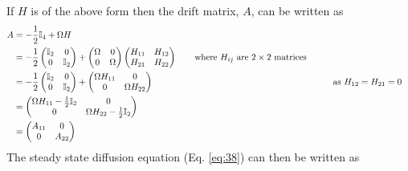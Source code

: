 \documentclass[11pt,a4paper]{article}
\numberwithin{equation}{section}
\begin{document}
	\color{red}If $H$ is of the above form then the drift matrix, $A$, can be written as
	\begin{align*}
	A &= -\frac{1}{2}\mathbb{I}_4 + \Omega H&\\
	 &= -\frac{1}{2} \begin{pmatrix}
	 \mathbb{I}_2 & 0  \\
	 0 & \mathbb{I}_2\\
	 \end{pmatrix} +  \begin{pmatrix}
	 \Omega & 0  \\
	 0 & \Omega\\
	 \end{pmatrix}
	 \begin{pmatrix}
	 H_{11} & H_{12}  \\
	 H_{21} & H_{22}\\
	 \end{pmatrix} \tag*{where $H_{ij}$ are $2 \times 2$ matrices}&\\
	  &=  -\frac{1}{2} \begin{pmatrix}
	  \mathbb{I}_2 & 0  \\
	  0 & \mathbb{I}_2\\
	  \end{pmatrix} +  \begin{pmatrix}
	  \Omega H_{11} & 0  \\
	  0 & \Omega H_{22}\\
	  \end{pmatrix}&\tag*{as $H_{12} = H_{21} = 0$}&\\
	  &= \begin{pmatrix}
	  \Omega H_{11} -\frac{1}{2}\mathbb{I}_2 & 0  \\
	  0 & \Omega H_{22}-\frac{1}{2}\mathbb{I}_2\\
	  \end{pmatrix}&\\
	  &= \begin{pmatrix}
	  A_{11} & 0  \\
	  0 & A_{22}\\
	  \end{pmatrix}&
	\end{align*}
	The steady state diffusion equation (Eq. \ref{eq:38}) can then be written as
\end{document}
